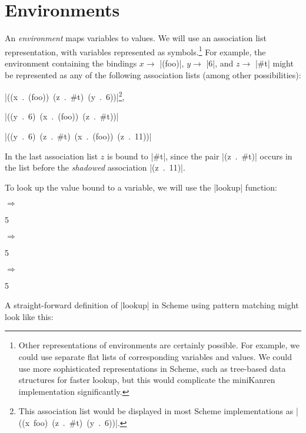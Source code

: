 \chapter{Environments}

An \emph{environment} maps variables to values.
%
We will use an association list representation, with variables
represented as symbols.\footnote{Other representations of environments
  are certainly possible.  For example, we could use separate flat
  lists of corresponding variables and values.  We could use more
  sophisticated representations in Scheme, such as tree-based data
  structures for faster lookup, but this would complicate the
  miniKanren implementation significantly.}
For example, the environment containing the bindings
%
$x \rightarrow$ \schemeresult|(foo)|,
%
$y \rightarrow$ \schemeresult|6|,
%
and 
%
$z \rightarrow$ \schemeresult|#t|
%
might be represented as any of the following association lists (among other possibilities):

\noindent\mbox{\schemeresult|((x . (foo)) (z . #t) (y . 6))|}\footnote{This association list would be displayed in most Scheme implementations as \mbox{\schemeresult|((x foo) (z . #t) (y . 6))|}.},

\noindent\mbox{\schemeresult|((y . 6) (x . (foo)) (z . #t))|}

\noindent\mbox{\schemeresult|((y . 6) (z . #t) (x . (foo)) (z . 11))|}

\noindent
In the last association list $z$ is bound to \schemeresult|#t|, since the pair \mbox{\schemeresult|(z . #t)|}
occurs in the list before the \emph{shadowed} association \mbox{\schemeresult|(z . 11)|}.

To look up the value bound to a variable, we will use the \scheme|lookup| function:

\noindent{} $\Rightarrow$
\begin{schemeresponsebox}5\end{schemeresponsebox}

\noindent{} $\Rightarrow$
\begin{schemeresponsebox}5\end{schemeresponsebox}

\noindent{} $\Rightarrow$
\begin{schemeresponsebox}5\end{schemeresponsebox}

A straight-forward definition of \scheme|lookup| in Scheme using
pattern matching might look like this:

